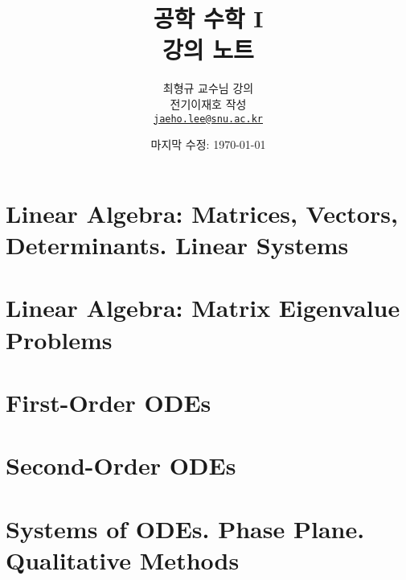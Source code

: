 \documentclass[unfonts,oneside,a4paper]{oblivoir}
\title{공학 수학 I\\강의 노트}
\author{최형규 교수님 강의\vspace{0.3cm}\\전기\textperiodcentered정보공학부 이재호 작성\\\href{mailto:jaeho.lee@snu.ac.kr}{\texttt{jaeho.lee@snu.ac.kr}}}
\date{마지막 수정: \today}
\theoremstyle{definition}
\theoremstyle{theorem}
\theoremstyle{theorem}
\theoremstyle{remark}
\theoremstyle{remark}
\theoremstyle{remark}
\theoremstyle{remark}
\begin{document}
\maketitle

\setcounter{section}{6}
\reversemarginpar{}
\section{Linear Algebra: Matrices, Vectors, Determinants. Linear Systems}


\section{Linear Algebra: Matrix Eigenvalue Problems}


\setcounter{section}{0}
\section{First-Order ODEs}


\section{Second-Order ODEs}


\section{Systems of ODEs. Phase Plane. Qualitative Methods}

\end{document}
